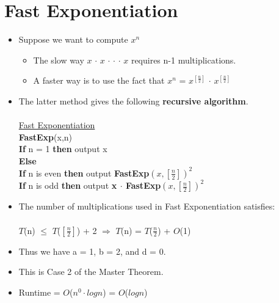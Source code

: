 \documentclass[12pt]{article}
\newcommand{\forceindent}{\leavevmode{\parindent=1em\indent}}
\begin{document}
\section{Fast Exponentiation}
\renewcommand{\labelitemii}{$\circ$}
\renewcommand{\labelitemiii}{$\cdot$}
\renewcommand{\labelitemiii}{$\rightarrow$}
\begin{itemize}
\item Suppose we want to compute $x^n$
	\begin{itemize}
	\item The slow way $x$ $\cdot$ $x$ $\cdot$ $\cdot$ $\cdot$ $x$ requires n-1 multiplications.
	\item A faster way is to use the fact that $x^n$ = $x^{[\frac{n}{2}]}$ $\cdot$ $x^{[\frac{n}{2}]}$
	\end{itemize}
\item The latter method gives the following \textbf{recursive algorithm}.\\
\\
{\large
\underline{Fast Exponentiation}\\
\textbf{FastExp}(x,n)\\
\textbf{If} n = 1 \textbf{then} output x\\
\textbf{Else} \\
\forceindent \textbf{If} n is even \textbf{then} output \textbf{FastExp}$(x,[\frac{n}{2}])^2$\\
\forceindent \textbf{If} n is odd \textbf{then} output \textbf{x $\cdot$ FastExp}$(x,[\frac{n}{2}])^2$
}
\item The number of multiplications used in Fast Exponentiation satisfies:\\
\\
{\large
$T$(n) $\leq$ $T$($[\frac{n}{2}]$) + 2 $\Rightarrow$ $T$(n) = $T$($\frac{n}{2}$) + $O$(1)}
\item Thus we have a = 1, b = 2, and d = 0.
\item This is Case 2 of the Master Theorem.
\item Runtime = $O$($n^0 \cdot log{}n$) = $O$($log{}n$)
\end{itemize}
\end{document}

